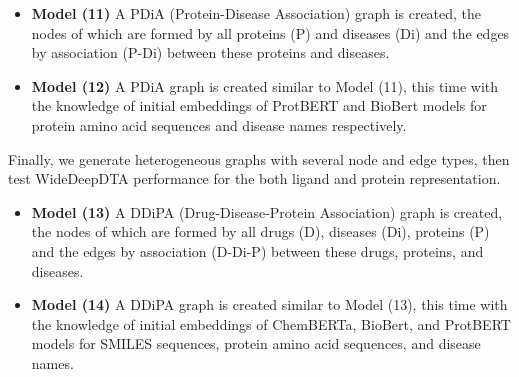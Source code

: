 \begin{itemize}
    \item \textbf{Model (11)} A PDiA (Protein-Disease Association) graph is created, the nodes of which are formed by all proteins (P) and diseases (Di) and the edges by association (P-Di) between these proteins and diseases.  
    \item \textbf{Model (12)} A PDiA graph is created similar to Model (11), this time with the knowledge of initial embeddings of ProtBERT and BioBert models for protein amino acid sequences and disease names respectively. 
\end{itemize}

Finally, we generate heterogeneous graphs with several node and edge types, then test WideDeepDTA performance for the both ligand and protein representation.

\begin{itemize}
    \item \textbf{Model (13)} A DDiPA (Drug-Disease-Protein Association) graph is created, the nodes of which are formed by all drugs (D), diseases (Di), proteins (P) and the edges by association (D-Di-P) between these drugs, proteins, and diseases.  
    \item \textbf{Model (14)} A DDiPA graph is created similar to Model (13), this time with the knowledge of initial embeddings of ChemBERTa, BioBert, and ProtBERT models for SMILES sequences, protein amino acid sequences, and disease names.
\end{itemize}


